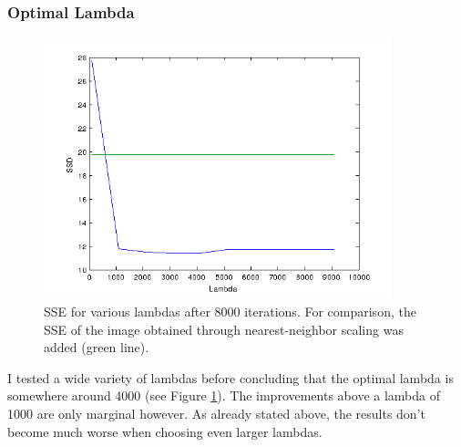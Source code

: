 \documentclass{paper}
\begin{document}
\clearpage
\subsubsection*{Optimal Lambda}
\begin{figure}[ht!]%
\centering
\includegraphics[width=0.9\textwidth]{lambda_vs_ssd.png}
\caption{SSE for various lambdas after 8000 iterations. For comparison, the
SSE of the image obtained through nearest-neighbor scaling was added (green line).}
\label{fig:lambda_vs_ssd}
\end{figure}
I tested a wide variety of lambdas before concluding that the optimal lambda
is somewhere around 4000 (see Figure \ref{fig:lambda_vs_ssd}). The improvements above a lambda
of 1000 are only marginal however. 
As already stated above, the results don't become
much worse when choosing even larger lambdas.
\end{document}
